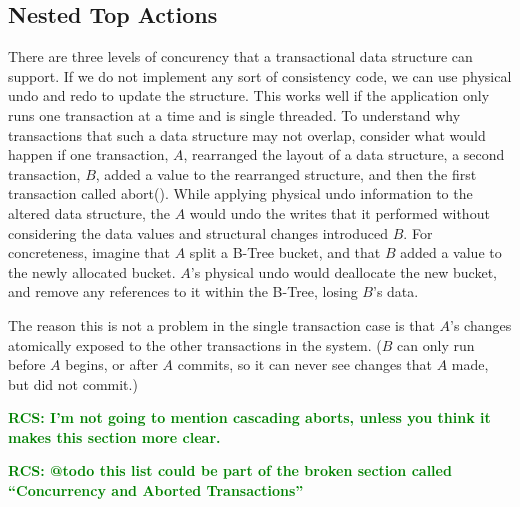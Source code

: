 \documentclass[letterpaper,twocolumn,english]{article}
\newcommand{\rcs}[1]{\textcolor{green}{\bf RCS: #1}}
\begin{document}
\subsection{Nested Top Actions}
\label{nested-top-actions}


There are three levels of concurency that a transactional data
structure can support.  If we do not implement any sort of consistency
code, we can use physical undo and redo to update the structure.  This
works well if the application only runs one transaction at a time and
is single threaded.  To understand why transactions that such a data
structure may not overlap, consider what would happen if one
transaction, $A$, rearranged the layout of a data structure, a second
transaction, $B$, added a value to the rearranged structure, and then
the first transaction called abort().  While applying physical undo
information to the altered data structure, the $A$ would undo the
writes that it performed without considering the data values and
structural changes introduced $B$.  For concreteness, imagine that $A$
split a B-Tree bucket, and that $B$ added a value to the newly
allocated bucket.  $A$'s physical undo would deallocate the new
bucket, and remove any references to it within the B-Tree, losing
$B$'s data.

The reason this is not a problem in the single transaction case is
that $A$'s changes atomically exposed to the other transactions in the
system.  ($B$ can only run before $A$ begins, or after $A$ commits, so
it can never see changes that $A$ made, but did not commit.)

\rcs{I'm not going to mention cascading aborts, unless you think it makes this section more clear.}

\rcs{@todo this list could be part of the broken section called ``Concurrency and Aborted Transactions''}
\end{document}
